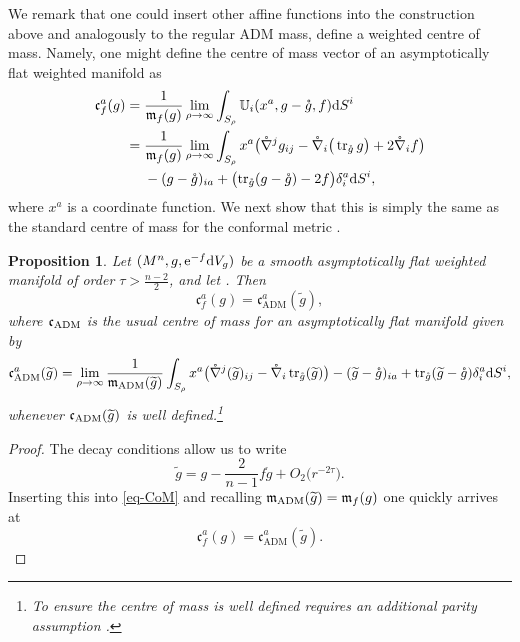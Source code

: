 \documentclass[10pt,a4paper]{amsart}
\numberwithin{equation}{section}
\newtheorem{Proposition}[Theorem]{Proposition}
\theoremstyle{definition}
\begin{document}
We remark that one could insert other affine functions into the construction above and analogously to the regular ADM mass, define a weighted centre of mass. Namely, one might define the centre of mass vector of an asymptotically flat weighted manifold as
\begin{align*}
		\mathfrak c^a_f(g)={}&\frac{1}{\mathfrak{m}_f(g)}\lim_{\rho\to\infty}\int_{S_\rho}\mathbb U_i(x^a,g-\mathring g,f){\rm d}S^i\\		={}&\frac{1}{\mathfrak{m}_f(g)}\lim_{\rho\to\infty}\int_{S_\rho}x^a\bigl(\mathring{\nabla}^{j}g_{ij}-\mathring{\nabla}_i\big(\operatorname{tr}_{\mathring g}g\big)+2 \mathring{\nabla}_if\bigr)
		\\ &  -(g-\mathring g)_{ia}
		+\bigl(\operatorname{tr}_{\mathring g}(g-\mathring g)-2f\bigr)\delta_i^a {\rm d}S^i,
\end{align*}
where $x^a$ is a coordinate function. We next show that this is simply the same as the standard centre of mass for the conformal metric .
\begin{Proposition}
	Let $(M^n,g,{\rm e}^{-f}{\rm d}V_g)$ be a smooth asymptotically flat weighted manifold of order $\tau>\frac{n-2}{2}$, and let . Then
	\[
	\mathfrak c^a_f(g)=\mathfrak c^a_{\mathrm{ADM}}(\widetilde g ),
	\]
	where $\mathfrak c_{\rm ADM}$ is the usual centre of mass for an asymptotically flat manifold given by
	\begin{gather} \label{eq-CoM}
			\mathfrak c_{\rm ADM}^a(\widetilde g) =\lim_{\rho\to\infty}\frac{1}{\mathfrak{m}_{\rm ADM}(\widetilde g)}\int_{S_\rho}
			x^a\bigl(\mathring\nabla^j(\widetilde g)_{ij}-\mathring\nabla_i\operatorname{tr}_{\mathring g}(\widetilde g)\bigr)
			-(\widetilde g -\mathring g)_{ia}+\operatorname{tr}_{\mathring g}(\widetilde g-\mathring g) \delta_i^{ a}{\rm d}S^i,
	\end{gather}
	whenever $\mathfrak c_{\rm ADM}(\widetilde g)$ is well defined.\footnote{ To ensure the centre of mass is well defined requires an additional parity assumption \cite{ReggeTeitelboim74}.}
\end{Proposition}
\begin{proof}
	The decay conditions allow us to write
	\begin{equation*}%
		\widetilde g
		= g - \frac{2}{n-1}f \mathring g + O_2\bigl(r^{-2\tau}\bigr).
	\end{equation*}
	Inserting this into \eqref{eq-CoM} and recalling $\mathfrak{m}_{\rm ADM}(\widetilde g)=\mathfrak{m}_f(g)$ one quickly arrives at
	\[
	\mathfrak c^a_f(g)=\mathfrak c^a_{\mathrm{ADM}}(\widetilde g). \tag*{\qed}
	\]\renewcommand{\qed}{}
\end{proof}
\end{document}
